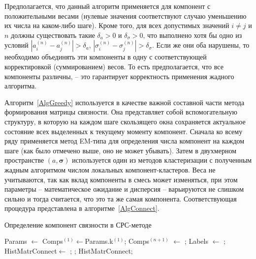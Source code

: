 Предполагается, что данный алгоритм применяется для компонент с положительными весами (нулевые значения соответствуют случаю уменьшению их числа на каком-либо шаге). Кроме того, для всех допустимых значений $i\neq j$ и $n$ должны существовать такие $\delta_a>0$ и $\delta_\sigma>0$, что выполнено хотя бы одно из условий $\left|a_i^{(n)}-a_j^{(n)}\right|>\delta_a$, $\left|\sigma_i^{(n)}-\sigma_j^{(n)}\right|>\delta_\sigma$. Если же они оба нарушены, то необходимо объединять эти компоненты в одну с соответствующей корректировкой (суммированием) весов. То есть предполагается, что все компоненты различны, -- это гарантирует корректность применения жадного алгоритма.

Алгоритм~\ref{AlgGreedy} используется в качестве важной составной части  метода формирования матрицы связности. Она представляет собой вспомогательную структуру, в которую на каждом шаге скользящего окна сохраняется актуальное состояние всех выделенных к текущему моменту компонент. Сначала ко всему ряду применяется метод EM-типа для определения числа компонент на каждом шаге (как было отмечено выше, оно не может убывать). Затем в двухмерном пространстве $(a, \boldsymbol \sigma)$ используется один из методов кластеризации с полученным жадным алгоритмом числом локальных компонент-кластеров. Веса не учитываются, так как вклад компоненты в смесь может изменяться, при этом параметры -- математическое ожидание и дисперсия -- варьируются не слишком сильно и тогда считается, что это та же самая компонента. Соответствующая процедура представлена в алгоритме~\ref{AlgConnect}.

\begin{algorithm}[!h]
	\caption{Определение компонент связности в СРС-методе}
	\label{AlgConnect}
	\begin{algorithmic}[1]
		\State Params $\gets$
		\State {}
		\State  Comps$^{(1)}$$\gets$Params.k$^{(1)}$;
		\State Comps$^{(n+1)}$ $\gets$ ;
		\EndFor
		\State {}
		\State Labels $\gets$ ;
		\State {}
		\State HistMatrConnect$\gets$ ;	
		\State {};
		\State \Return HistMatrConnect;
		\EndFunction
	\end{algorithmic}
\end{algorithm}

